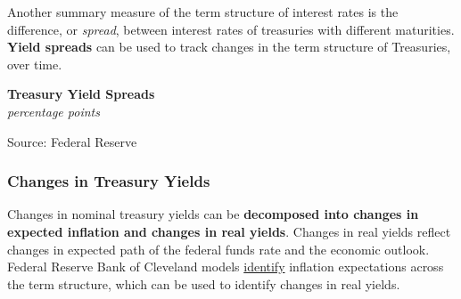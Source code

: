 \documentclass{report}
\makeatletter
\newcommand{\tbllink}[1]{\href{https://raw.githubusercontent.com/bdecon/US-chartbook/master/chartbook/data/#1}{\faTable}}
\newcommand*\short[1]{\expandafter\@gobbletwo\number\numexpr#1\relax}
\newcommand{\ltdateaxisticks}{
		date coordinates in=x, axis line style={draw=none},
		xmax={2024-01-31},
		max space between ticks=40,	    
		xtick={{2013-01-01}, {2014-01-01}, {2015-01-01}, {2016-01-01}, 
			{2017-01-01}, {2018-01-01}, {2019-01-01}, {2020-01-01}, {2021-01-01},
			{2022-01-01}, {2023-01-01}, {2024-01-01}},
		enlarge y limits={0.06}, enlarge x limits={0.01},
		xticklabel style={align=center, yshift=-2pt}, tick label style={inner sep=0pt},
		}
\newcommand{\bbar}[2]{extra #1 ticks = {{#2}}, extra #1 tick labels = ,
		extra #1 tick style = {grid=major, grid style={thick, black!25}},}
\newcommand{\thinline}[4]{\addplot[no markers, color=#1] 
		table [x=#2, y=#3, col sep=comma] {#4};	}
\newcommand{\rbar}{
		\fill[color=black!10] (axis cs:{2020-02-01},\pgfkeysvalueof{/pgfplots/ymin}) 
			rectangle (axis cs:{2020-05-01}, \pgfkeysvalueof{/pgfplots/ymax});}
\makeatother
\begin{document}
{\begin{minipage}{1.0\textwidth}
\small Another summary measure of the term structure of interest rates is the difference, or \textit{spread}, between interest rates of treasuries with different maturities. \textbf{Yield spreads} can be used to track changes in the term structure of Treasuries, over time.


\vspace{0.5mm}

\normalsize \textbf{Treasury Yield Spreads}\\
\footnotesize{\textit{percentage points}}
\vspace{3.3cm}

\hspace{1mm} 
	
\footnotesize{Source: Federal Reserve} \hfill \tbllink{spread.csv} 
\end{minipage}
\newpage
\begin{minipage}{1.0\textwidth} 
\subsubsection*{Changes in Treasury Yields}
 
\small Changes in nominal treasury yields can be \textbf{decomposed into changes in expected inflation and changes in real yields}. Changes in real yields reflect changes in expected path of the federal funds rate and the economic outlook. Federal Reserve Bank of Cleveland models \href{https://www.clevelandfed.org/en/our-research/indicators-and-data/inflation-expectations.aspx}{identify} inflation expectations across the term structure, which can be used to identify changes in real yields. 


\end{minipage}}
\end{document}
